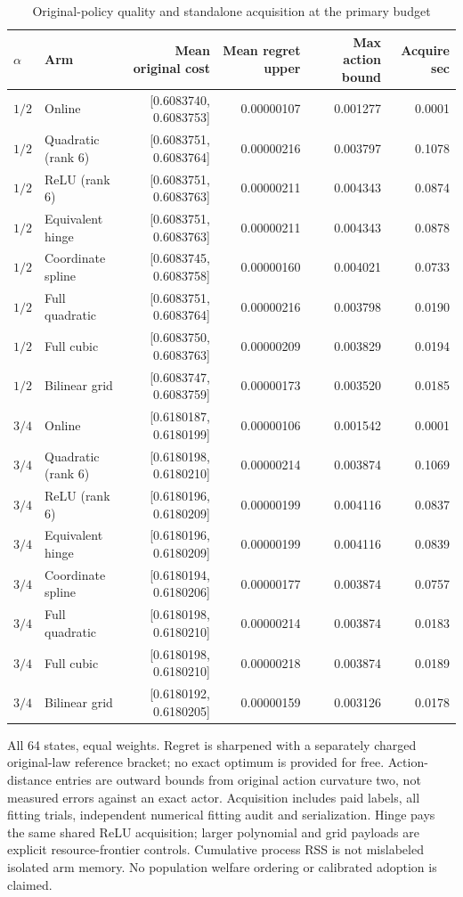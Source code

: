 \begin{table}[htbp]\caption{Original-policy quality and standalone acquisition at the primary budget}\label{tab:quality110}
\centering\scriptsize
\begin{tabular}{@{}llrrrr@{}}\toprule
$\alpha$ & Arm & Mean original cost & Mean regret upper & Max action bound & Acquire sec\\\midrule
$1/2$ & Online & [0.6083740, 0.6083753] & 0.00000107 & 0.001277 & 0.0001\\
$1/2$ & Quadratic (rank 6) & [0.6083751, 0.6083764] & 0.00000216 & 0.003797 & 0.1078\\
$1/2$ & ReLU (rank 6) & [0.6083751, 0.6083763] & 0.00000211 & 0.004343 & 0.0874\\
$1/2$ & Equivalent hinge & [0.6083751, 0.6083763] & 0.00000211 & 0.004343 & 0.0878\\
$1/2$ & Coordinate spline & [0.6083745, 0.6083758] & 0.00000160 & 0.004021 & 0.0733\\
$1/2$ & Full quadratic & [0.6083751, 0.6083764] & 0.00000216 & 0.003798 & 0.0190\\
$1/2$ & Full cubic & [0.6083750, 0.6083763] & 0.00000209 & 0.003829 & 0.0194\\
$1/2$ & Bilinear grid & [0.6083747, 0.6083759] & 0.00000173 & 0.003520 & 0.0185\\
$3/4$ & Online & [0.6180187, 0.6180199] & 0.00000106 & 0.001542 & 0.0001\\
$3/4$ & Quadratic (rank 6) & [0.6180198, 0.6180210] & 0.00000214 & 0.003874 & 0.1069\\
$3/4$ & ReLU (rank 6) & [0.6180196, 0.6180209] & 0.00000199 & 0.004116 & 0.0837\\
$3/4$ & Equivalent hinge & [0.6180196, 0.6180209] & 0.00000199 & 0.004116 & 0.0839\\
$3/4$ & Coordinate spline & [0.6180194, 0.6180206] & 0.00000177 & 0.003874 & 0.0757\\
$3/4$ & Full quadratic & [0.6180198, 0.6180210] & 0.00000214 & 0.003874 & 0.0183\\
$3/4$ & Full cubic & [0.6180198, 0.6180210] & 0.00000218 & 0.003874 & 0.0189\\
$3/4$ & Bilinear grid & [0.6180192, 0.6180205] & 0.00000159 & 0.003126 & 0.0178\\
\bottomrule\end{tabular}
\par\smallskip\begin{minipage}{.98\linewidth}\footnotesize
All 64 states, equal weights. Regret is sharpened with a separately charged original-law reference bracket; no exact optimum is provided for free. Action-distance entries are outward bounds from original action curvature two, not measured errors against an exact actor. Acquisition includes paid labels, all fitting trials, independent numerical fitting audit and serialization. Hinge pays the same shared ReLU acquisition; larger polynomial and grid payloads are explicit resource-frontier controls. Cumulative process RSS is not mislabeled isolated arm memory. No population welfare ordering or calibrated adoption is claimed.
\end{minipage}\end{table}
